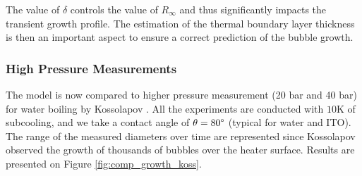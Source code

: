 \npar

The value of $\delta$ controls the value of $R_{\infty}$ and thus significantly impacts the transient growth profile. The estimation of the thermal boundary layer thickness is then an important aspect to ensure a correct prediction of the bubble growth.

\subsubsection{High Pressure Measurements}

The model is now compared to higher pressure measurement (20 bar and 40 bar) for water boiling by Kossolapov \cite{kossolapov_experimental_2021}. All the experiments are conducted with $10$K of subcooling, and we take a contact angle of $\theta=80\degree$ (typical for water and ITO). The range of the measured diameters over time are represented since Kossolapov observed the growth of thousands of bubbles over the heater surface. Results are presented on Figure \ref{fig:comp_growth_koss}.



